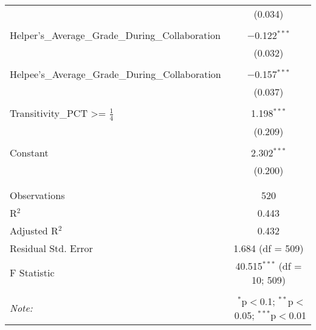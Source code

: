 \documentclass[a4paper]{article}
\begin{document}
\begin{table}[!htbp]
\begin{tabular}{@{\extracolsep{5pt}}lc}
  & (0.034) \\ 
  & \\ 
Helper's\_Average\_Grade\_During\_Collaboration & $-$0.122$^{***}$ \\ 
  & (0.032) \\ 
  & \\ 
Helpee's\_Average\_Grade\_During\_Collaboration & $-$0.157$^{***}$ \\ 
  & (0.037) \\ 
  & \\ 
 Transitivity\_PCT \textgreater =  $\frac{1}{4}$ & 1.198$^{***}$ \\ 
  & (0.209) \\ 
  & \\ 
 Constant & 2.302$^{***}$ \\ 
  & (0.200) \\ 
  & \\ 
\hline \\[-1.8ex] 
Observations & 520 \\ 
R$^{2}$ & 0.443 \\ 
Adjusted R$^{2}$ & 0.432 \\ 
Residual Std. Error & 1.684 (df = 509) \\ 
F Statistic & 40.515$^{***}$ (df = 10; 509) \\ 
\hline 
\hline \\[-1.8ex] 
\textit{Note:}  & \multicolumn{1}{r}{$^{*}$p$<$0.1; $^{**}$p$<$0.05; $^{***}$p$<$0.01} \\ 
\end{tabular} 
\end{table} 
\end{document}
